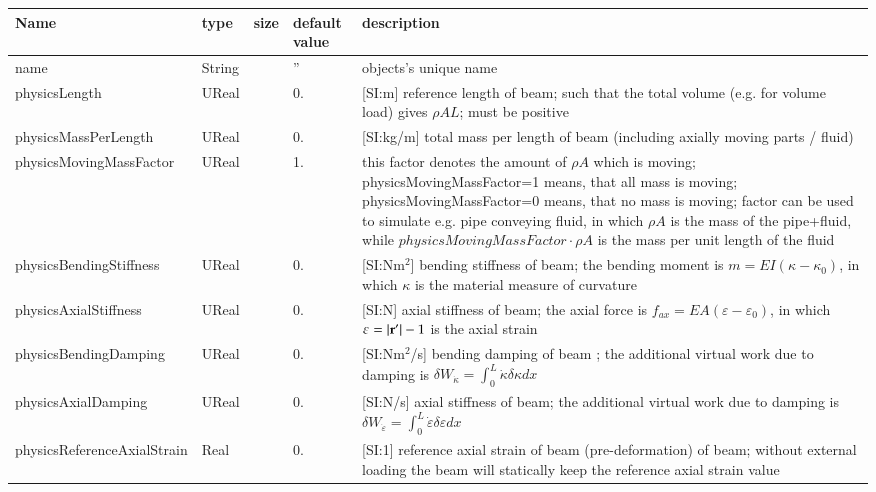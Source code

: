 \begin{center}
  \footnotesize
  \begin{longtable}{| p{4.5cm} | p{2.5cm} | p{0.5cm} | p{2.5cm} | p{6cm} |}
    \hline
    \bf Name & \bf type & \bf size & \bf default value & \bf description \\ \hline
    name &     String &      &     '' &     objects's unique name\\ \hline
    physicsLength &     UReal &      &     0. &      [SI:m] reference length of beam; such that the total volume (e.g. for volume load) gives $\rho A L$; must be positive\\ \hline
    physicsMassPerLength &     UReal &      &     0. &      [SI:kg/m] total mass per length of beam (including axially moving parts / fluid)\\ \hline
    physicsMovingMassFactor &     UReal &      &     1. &     this factor denotes the amount of $\rho A$ which is moving; physicsMovingMassFactor=1 means, that all mass is moving; physicsMovingMassFactor=0 means, that no mass is moving; factor can be used to simulate e.g. pipe conveying fluid, in which $\rho A$ is the mass of the pipe+fluid, while $physicsMovingMassFactor \cdot \rho A$ is the mass per unit length of the fluid\\ \hline
    physicsBendingStiffness &     UReal &      &     0. &      [SI:Nm$^2$] bending stiffness of beam; the bending moment is $m = EI (\kappa - \kappa_0)$, in which $\kappa$ is the material measure of curvature\\ \hline
    physicsAxialStiffness &     UReal &      &     0. &      [SI:N] axial stiffness of beam; the axial force is $f_{ax} = EA (\varepsilon -\varepsilon_0)$, in which $\varepsilon = |\mathbf{r}^\prime|-1$ is the axial strain\\ \hline
    physicsBendingDamping &     UReal &      &     0. &      [SI:Nm$^2$/s] bending damping of beam ; the additional virtual work due to damping is $\delta W_{\dot \kappa} = \int_0^L \dot \kappa \delta \kappa dx$\\ \hline
    physicsAxialDamping &     UReal &      &     0. &      [SI:N/s] axial stiffness of beam; the additional virtual work due to damping is $\delta W_{\dot\varepsilon} = \int_0^L \dot \varepsilon \delta \varepsilon dx$\\ \hline
    physicsReferenceAxialStrain &     Real &      &     0. &      [SI:1] reference axial strain of beam (pre-deformation) of beam; without external loading the beam will statically keep the reference axial strain value\\ \hline

\end{longtable}
\end{center}
